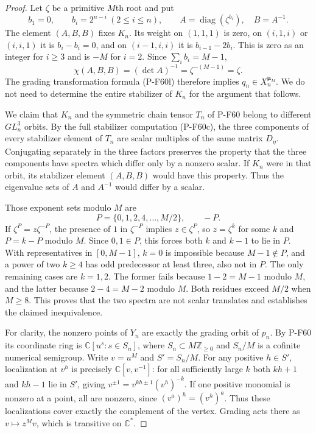 \begin{proof}
Let $\zeta$ be a primitive $M$th root and put
\[
 b_1=0,\qquad b_i=2^{n-i}\ (2\le i\le n),\qquad
 A=\operatorname{diag}(\zeta^{b_i}),\quad B=A^{-1}.
                                                        \tag{P-F64e}
\]
The element $(A,B,B)$ fixes $K_n$.  Its weight on
$(1,1,1)$ is zero, on $(i,1,i)$ or $(i,i,1)$ it is
$b_i-b_i=0$, and on $(i-1,i,i)$ it is
$b_{i-1}-2b_i$.  This is zero as an integer for
$i\ge3$ and is $-M$ for $i=2$.
Since $\sum_i b_i=M-1$,
\[
       \chi(A,B,B)=(\det A)^{-1}
                   =\zeta^{-(M-1)}=\zeta.
                                                        \tag{P-F64f}
\]
The grading transformation formula (P-F60l) therefore
implies $q_n\in X_n^{\boldsymbol\mu_M}$.
We do not need to determine the entire stabilizer of
$K_n$ for the argument that follows.

We claim that $K_n$ and the symmetric chain tensor
$T_n$ of P-F60 belong to different $GL_n^3$ orbits.
By the full stabilizer computation (P-F60c), the
three components of every stabilizer element of $T_n$
are scalar multiples of the same matrix $D_\eta$.
Conjugating separately in the three factors preserves
the property that the three components have spectra
which differ only by a nonzero scalar.  If $K_n$
were in that orbit, its stabilizer element $(A,B,B)$
would have this property.  Thus the eigenvalue sets
of $A$ and $A^{-1}$ would differ by a scalar.

Those exponent sets modulo $M$ are
\[
        P=\{0,1,2,4,\ldots,M/2\},\qquad -P.
                                                        \tag{P-F64g}
\]
If $\zeta^P=z\zeta^{-P}$, the presence of $1$ in
$\zeta^{-P}$ implies $z\in\zeta^P$, so $z=\zeta^k$
for some $k$ and $P=k-P$ modulo $M$.
Since $0,1\in P$, this forces both $k$ and $k-1$
to lie in $P$.  With representatives in $[0,M-1]$,
$k=0$ is impossible because $M-1\notin P$, and a
power of two $k\ge4$ has odd predecessor at least
three, also not in $P$.  The only remaining cases
are $k=1,2$.  The former fails because $1-2=M-1$
modulo $M$, and the latter because $2-4=M-2$ modulo
$M$.  Both residues exceed $M/2$ when $M\ge8$.
This proves that the two spectra are not scalar
translates and establishes the claimed inequivalence.

For clarity, the nonzero points of $Y_n$ are exactly
the grading orbit of $p_n$.  By P-F60 its coordinate
ring is $\mathbb C[u^s:s\in S_n]$, where
$S_n\subset M\mathbb Z_{\ge0}$ and $S_n/M$ is a
cofinite numerical semigroup.  Write $v=u^M$ and
$S'=S_n/M$.  For any positive $h\in S'$, localization
at $v^h$ is precisely $\mathbb C[v,v^{-1}]$:
for all sufficiently large $k$ both $kh+1$ and
$kh-1$ lie in $S'$, giving
$v^{\pm1}=v^{kh\pm1}(v^h)^{-k}$.
If one positive monomial is nonzero at a point, all
are nonzero, since $(v^a)^h=(v^h)^a$.
Thus these localizations cover exactly the complement
of the vertex.  Grading acts there as $v\mapsto z^M v$,
which is transitive on $\mathbb C^*$.


\end{proof}
